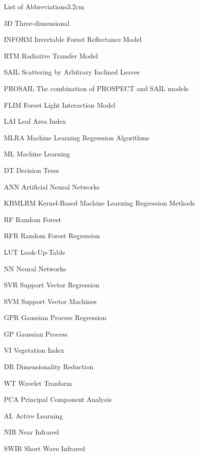 \begin{mclistof}{List of Abbreviations}{3.2cm}

\item[3D] Three-dimensional
\item[INFORM] Invertable Forest Reflectance Model
\item[RTM] Radiative Transfer Model
\item[SAIL] Scattering by Arbitrary Inclined Leaves
\item[PROSAIL] The combination of PROSPECT and SAIL models
\item[FLIM] Forest Light Interaction Model
\item[LAI] Leaf Area Index
\item[MLRA] Machine Learning Regression Algorithms
\item[ML] Machine Learning
\item[DT] Decision Trees
\item[ANN] Artificial Neural Networks
\item[KBMLRM] Kernel-Based Machine Learning Regression Methods
\item[RF] Random Forest
\item[RFR] Random Forest Regression
\item[LUT] Look-Up-Table
\item[NN] Neural Networks
\item[SVR] Support Vector Regression
\item[SVM] Support Vector Machines
\item[GPR] Gaussian Process Regression
\item[GP] Gaussian Process
\item[VI] Vegetation Index
\item[DR] Dimensionality Reduction
\item[WT] Wavelet Tranform
\item[PCA] Principal Component Analysis
\item[AL] Active Learning
\item[NIR] Near Infrared
\item[SWIR] Short Wave Infrared

\end{mclistof} 
